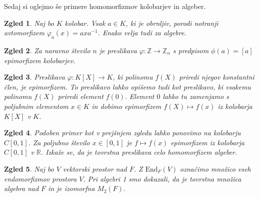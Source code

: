 \documentclass[10pt, a4paper]{article}
\newtheorem{zgled}{Zgled}[section]
\newcommand{\Z}{\mathbb {Z}}
\newcommand{\R}{\mathbb {R}}
\begin{document}
Sedaj si oglejmo še primere homomorfizmov kolobarjev in algeber.

\begin{zgled}
  Naj bo $K$ kolobar.
  Vsak $a \in K$, ki je obrnljiv, porodi notranji avtomorfizem $\varphi_a(x) = a x a^{-1}$.
  Enako velja tudi za algebre.
\end{zgled}

\begin{zgled}
  Za naravno število $n$ je preslikava $\varphi: \Z \to \Z_n$ s predpisom $\phi(a) = [a]$ epimorfizem kolobarjev. 
\end{zgled}

\begin{zgled}
  Preslikava $\varphi: K[X] \to K$, ki polinomu $f(X)$ priredi njegov konstantni člen, je epimorfizem.
  To preslikavo lahko opišemo tudi kot preslikavo, ki vsakemu polinomu $f(X)$ priredi element $f(0).$
  Element $0$ lahko tu zamenjamo s poljubnim elementom $x \in K$ in dobimo 
  epimorfizem $f(X) \mapsto f(x)$ iz kolobarja $K[X]$ v $K$.
\end{zgled}

\begin{zgled}
  Podoben primer kot v prejšnjem zgledu lahko ponovimo na kolobarju $C[0, 1]$.
  Za poljubno število $x \in [0, 1]$ je $f \mapsto f(x)$ epimorfizem iz kolobarja $C[0, 1]$ v $\R$.
  Izkaže se, da je tovrstna preslikava celo homomorfizem algeber.
\end{zgled}

\begin{zgled}
  Naj bo $V$ vektorski prostor nad $F$. Z $\mathrm{End}_F (V)$ označimo množico vseh endomorfizmov prostora $V$.
  Pri algebri 1 smo dokazali, da je tovrstna množica algebra nad $F$ in je izomorfna $M_2 (F)$.
\end{zgled}
\end{document}
